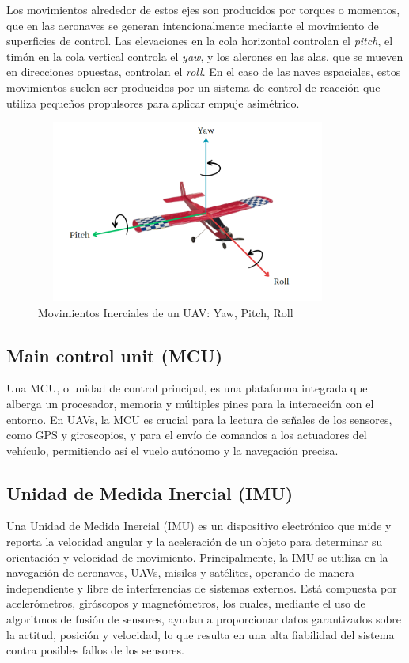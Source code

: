 Los movimientos alrededor de estos ejes son producidos por torques o momentos, que en las aeronaves se generan intencionalmente mediante el movimiento de superficies de control. Las elevaciones en la cola horizontal controlan el \textit{pitch}, el timón en la cola vertical controla el \textit{yaw}, y los alerones en las alas, que se mueven en direcciones opuestas, controlan el \textit{roll}. En el caso de las naves espaciales, estos movimientos suelen ser producidos por un sistema de control de reacción que utiliza pequeños propulsores para aplicar empuje asimétrico.\cite{UAV2}

\begin{figure}[H]
    \centering
    \includegraphics[width=10cm, height=6cm]{Imagenes/Marco Teorico/YAW_PITCH_ROLL_UAV.png}
    \caption{Movimientos Inerciales de un UAV: Yaw, Pitch, Roll}
    \label{fig:waypoints}
\end{figure}



\subsection{Main control unit (MCU)}
Una MCU, o unidad de control principal, es una plataforma integrada que alberga un procesador, memoria y múltiples pines para la interacción con el entorno. En UAVs, la MCU es crucial para la lectura de señales de los sensores, como GPS y giroscopios, y para el envío de comandos a los actuadores del vehículo, permitiendo así el vuelo autónomo y la navegación precisa. \cite{MCU}


\subsection{Unidad de Medida Inercial (IMU)}
Una Unidad de Medida Inercial (IMU) es un dispositivo electrónico que mide y reporta la velocidad angular y la aceleración de un objeto para determinar su orientación y velocidad de movimiento. Principalmente, la IMU se utiliza en la navegación de aeronaves, UAVs, misiles y satélites, operando de manera independiente y libre de interferencias de sistemas externos. Está compuesta por acelerómetros, giróscopos y magnetómetros, los cuales, mediante el uso de algoritmos de fusión de sensores, ayudan a proporcionar datos garantizados sobre la actitud, posición y velocidad, lo que resulta en una alta fiabilidad del sistema contra posibles fallos de los sensores. \cite{IMU}

